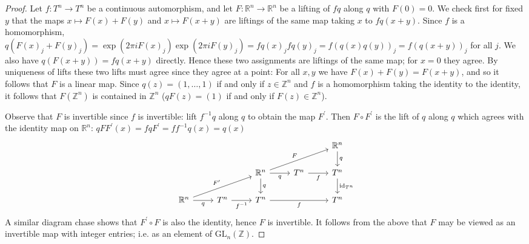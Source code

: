 \documentclass[11pt]{article}
\DeclareMathOperator{\id}{id}
\begin{document}
\begin{enumerate}
\begin{proof}
      Let $f\colon T^n\to T^n$ be a continuous automorphism, and let $F\colon\mathbb{R}^n\to \mathbb{R}^n$ be a lifting of $fq$ along $q$ with $F(0) = 0$. We check first for fixed $y$ that the maps $x\mapsto F(x)+F(y)$ and $x\mapsto F(x+y)$ are liftings of the same map taking $x$ to $fq(x+y)$. Since $f$ is a homomorphism, $q(F(x)_j+F(y)_j) = \exp(2\pi i F(x)_j)\exp(2\pi i F(y)_j) = fq(x)_jfq(y)_j = f(q(x)q(y))_j = f(q(x+y))_j$ for all $j$. We also have $q(F(x+y)) = fq(x+y)$ directly. Hence these two assignments are liftings of the same map; for $x = 0$ they agree. By uniqueness of lifts these two lifts must agree since they agree at a point: For all $x,y$ we have $F(x)+F(y) = F(x+y)$, and so it follows that $F$ is a linear map. Since $q(z) = (1,\dots,1)$ if and only if $z\in \mathbb{Z}^n$ and $f$ is a homomorphism taking the identity to the identity, it follows that $F(\mathbb{Z}^n)$ is contained in $\mathbb{Z}^n$ ($qF(z) = (1)$ if and only if $F(z)\in \mathbb{Z}^n$).

      Observe that $F$ is invertible since $f$ is invertible: lift $f^{-1}q$ along $q$ to obtain the map $F^\prime$. Then $F\circ F^\prime$ is the lift of $q$ along $q$ which agrees with the identity map on $\mathbb{R}^n$: $qFF^\prime(x) = fqF^\prime = ff^{-1}q(x) = q(x)$%
      \[\begin{tikzcd}
        &&&& {\mathbb{R}^n} \\
        && {\mathbb{R}^n} & {T^n} & {T^n} \\
        {\mathbb{R}^n} & {T^n} & {T^n} && {T^n}
        \arrow["q"', from=3-1, to=3-2]
        \arrow["{f^{-1}}"', from=3-2, to=3-3]
        \arrow["{F^\prime}", from=3-1, to=2-3]
        \arrow["q", from=2-3, to=3-3]
        \arrow["q"', from=2-3, to=2-4]
        \arrow["f"', from=2-4, to=2-5]
        \arrow["f"', from=3-3, to=3-5]
        \arrow["{\id_{T^n}}", from=2-5, to=3-5]
        \arrow["F", from=2-3, to=1-5]
        \arrow["q", from=1-5, to=2-5]
      \end{tikzcd}\] A similar diagram chase shows that $F^\prime\circ F$ is also the identity, hence $F$ is invertible. It follows from the above that $F$ may be viewed as an invertible map with integer entries; i.e. as an element of $\mathrm{GL}_n(\mathbb{Z})$.


\end{proof}
\end{enumerate}
\end{document}
